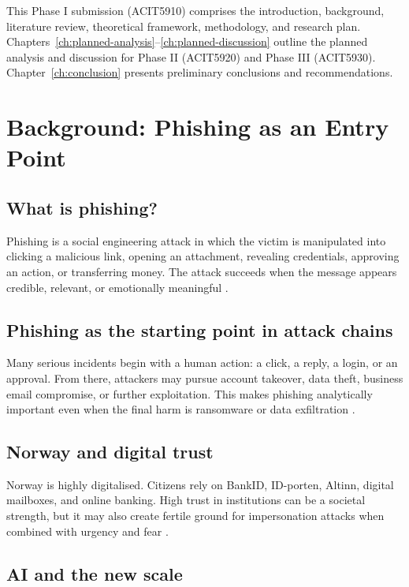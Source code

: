 \documentclass[UKenglish,12pt]{master-style}
\begin{document}
This Phase I submission (ACIT5910) comprises the introduction, background, literature review, theoretical framework, methodology, and research plan. Chapters~\ref{ch:planned-analysis}--\ref{ch:planned-discussion} outline the planned analysis and discussion for Phase II (ACIT5920) and Phase III (ACIT5930). Chapter~\ref{ch:conclusion} presents preliminary conclusions and recommendations.

\chapter{Background: Phishing as an Entry Point}

\section{What is phishing?}

Phishing is a social engineering attack in which the victim is manipulated into clicking a malicious link, opening an attachment, revealing credentials, approving an action, or transferring money. The attack succeeds when the message appears credible, relevant, or emotionally meaningful \parencite{hadnagy2018social,conteh2016cybersecurity}.

\section{Phishing as the starting point in attack chains}

Many serious incidents begin with a human action: a click, a reply, a login, or an approval. From there, attackers may pursue account takeover, data theft, business email compromise, or further exploitation. This makes phishing analytically important even when the final harm is ransomware or data exfiltration \parencite{enisa2024threat,microsoft2024digitaldefense}.

\section{Norway and digital trust}

Norway is highly digitalised. Citizens rely on BankID, ID-porten, Altinn, digital mailboxes, and online banking. High trust in institutions can be a societal strength, but it may also create fertile ground for impersonation attacks when combined with urgency and fear \parencite{politiet2024nettsvindel,nsm2026risk}.

\section{AI and the new scale}
\end{document}
